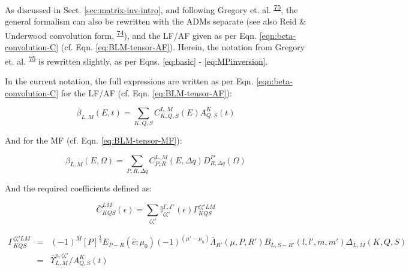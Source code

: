 \documentclass[10pt]{article}
\begin{document}


As discussed in Sect. \ref{sec:matrix-inv-intro}, and following Gregory et. al. \textsuperscript{\hyperref[csl:75]{75}}, the general formalism can also be rewritten with the ADMs separate (see also Reid \& Underwood convolution form, \textsuperscript{\hyperref[csl:74]{74}}), and the LF/AF given as per Eqn. \ref{eqn:beta-convolution-C} (cf. Eqn. \ref{eq:BLM-tensor-AF}). Herein, the notation from Gregory et. al. \textsuperscript{\hyperref[csl:75]{75}} is rewritten slightly, as per Eqns. \ref{eq:basic} - \ref{eq:MPinversion}.

In the current notation, the full expressions are written as per Eqn. \ref{eqn:beta-convolution-C} for the LF/AF (cf. Eqn. \ref{eq:BLM-tensor-AF}):

\begin{equation}
\bar{\beta}_{L,M}(E,t)=\sum_{K,Q,S}C_{K,Q,S}^{L,M}(E)A_{Q,S}^{K}(t)
\end{equation}


And for the MF (cf. Eqn. \ref{eq:BLM-tensor-MF}):

\begin{equation}
\beta_{L,M}(E,\Omega)=\sum_{P,R,\Delta q}C_{P,R}^{L,M}(E,\Delta q)D_{R,\Delta q}^{P}(\Omega)
\end{equation}

And the required coefficients defined as:

\begin{equation}
\bar{C}_{KQS}^{LM}(\epsilon)=\sum_{\zeta\zeta'}\mathbb{I}_{\zeta\zeta'}^{\Gamma,\Gamma'}(\epsilon)\Gamma_{KQS}^{\zeta\zeta'LM}
\end{equation}

\begin{eqnarray}
\Gamma_{KQS}^{\zeta\zeta'LM} & = & (-1)^{M}[P]^{\frac{1}{2}}E_{P-R}(\hat{e};\mu_{0})(-1)^{(\mu'-\mu_{0})}\bar{\Lambda}_{R'}(\mu,P,R')B_{L,S-R'}(l,l',m,m')\Delta_{L,M}(K,Q,S)\\
 & = & \bar{\varUpsilon}_{L,M}^{u,\zeta\zeta'}/A_{Q,S}^{K}(t)
\end{eqnarray}
\end{document}
